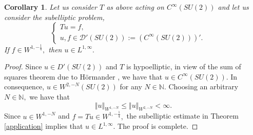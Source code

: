 \documentclass[12pt, reqno]{amsart}
\newtheorem{corollary}[theorem]{Corollary}
\theoremstyle{definition}
\theoremstyle{remark}
\numberwithin{equation}{section}
\begin{document}
\begin{corollary} Let us consider $T$ as above acting on $C^\infty(SU(2))$ and let us consider the subelliptic problem,
    \begin{equation}\label{IVP} \begin{cases}Tu=f ,& \text{ }
\\u,f\in \mathscr{D}'(SU(2)):=(C^\infty(SU(2)))'. & \text{ } \end{cases}
\end{equation} If $f\in W^{1,-\frac{1}{4}},$ then $u\in L^{1,\infty}.$
\end{corollary}
\begin{proof}
    Since $u\in D'(SU(2))$ and $T$ is hypoelliptic, in view of the sum of squares theorem due to H\"ormander \cite{13}, we have that $u\in C^\infty(SU(2)).$ In consequence, $u\in W^{2,-N}(SU(2))$ for any $N\in \mathbb{N}.$ Choosing an arbitrary $N\in \mathbb{N},$ we have that 
    \begin{equation}
        \Vert u\Vert_{  W^{1,-N} }\leq \Vert u\Vert_{  W^{2,-N} }<\infty.
    \end{equation} Since $u\in  W^{1,-N}  $ and $f=Tu\in W^{1,-\frac{1}{4}},$ the subelliptic estimate in Theorem \ref{application} implies that $u\in L^{1,\infty}.$ The proof is complete.
\end{proof}
\end{document}
